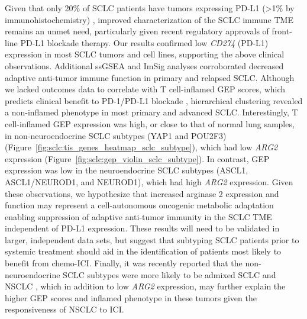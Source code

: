 Given that only \textapprox{}20\% of SCLC patients have tumors expressing PD-L1 (\textgreater{}1\% by immunohistochemistry) \cite{iams2020}, improved characterization of the SCLC immune TME remains an unmet need, particularly given recent regulatory approvals of front-line PD-L1 blockade therapy. Our results confirmed low \textit{CD274} (PD-L1) expression in most SCLC tumors and cell lines, supporting the above clinical observations. Additional ssGSEA and ImSig analyses corroborated decreased adaptive anti-tumor immune function in primary and relapsed SCLC\@. Although we lacked outcomes data to correlate with T cell-inflamed GEP scores, which predicts clinical benefit to PD-1/PD-L1 blockade \cite{gao2013}, hierarchical clustering revealed a non-inflamed phenotype in most primary and advanced SCLC\@. Interestingly, T cell-inflamed GEP expression was high, or close to that of normal lung samples, in non-neuroendocrine SCLC subtypes (YAP1 and POU2F3) (Figure~\ref{fig:sclc:tis_genes_heatmap_sclc_subtype}), which had low \textit{ARG2} expression (Figure~\ref{fig:sclc:gep_violin_sclc_subtype}). In contrast, GEP expression was low in the neuroendocrine SCLC subtypes (ASCL1, ASCL1/NEUROD1, and NEUROD1), which had high \textit{ARG2} expression. Given these observations, we hypothesize that increased arginase 2 expression and function may represent a cell-autonomous oncogenic metabolic adaptation enabling suppression of adaptive anti-tumor immunity in the SCLC TME independent of PD-L1 expression. These results will need to be validated in larger, independent data sets, but suggest that subtyping SCLC patients prior to systemic treatment should aid in the identification of patients most likely to benefit from chemo-ICI\@. Finally, it was recently reported that the non-neuroendocrine SCLC subtypes were more likely to be admixed SCLC and NSCLC \cite{baine2020}, which in addition to low \textit{ARG2} expression, may further explain the higher GEP scores and inflamed phenotype in these tumors given the responsiveness of NSCLC to ICI\@.

